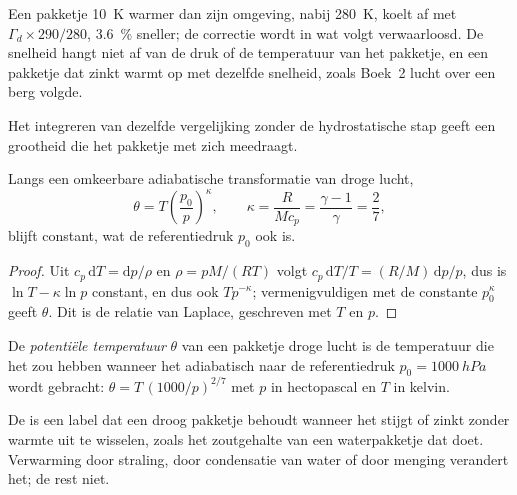 Een pakketje \qty{10}{K} warmer dan zijn omgeving, nabij \qty{280}{K}, koelt af met
$\Gamma_d \times 290/280$, \qty{3.6}{\percent} sneller; de correctie wordt
in wat volgt verwaarloosd. De snelheid hangt niet af van de druk of de temperatuur van
het pakketje, en een pakketje dat zinkt warmt op met dezelfde snelheid, zoals Boek~2
lucht over een berg volgde.

Het integreren van dezelfde vergelijking zonder de hydrostatische stap geeft een grootheid die het pakketje met zich meedraagt.

\begin{proposition}\label{prop:b1:fluid-envelopes-structure:theta}
Langs een omkeerbare adiabatische transformatie van droge lucht,
\[
  \theta = T\left(\frac{p_0}{p}\right)^{\kappa},\qquad \kappa = \frac{R}{Mc_p} =
  \frac{\gamma - 1}{\gamma} = \frac{2}{7},
\]
blijft constant, wat de referentiedruk $p_0$ ook is.
\end{proposition}

\begin{proof}
Uit $c_p\,\mathrm dT = \mathrm dp/\rho$ en $\rho = pM/(RT)$ volgt $c_p\,\mathrm dT/T
= (R/M)\,\mathrm dp/p$, dus is $\ln T - \kappa \ln p$ constant, en dus ook $T
p^{-\kappa}$; vermenigvuldigen met de constante $p_0^{\kappa}$ geeft $\theta$. Dit is
de relatie van Laplace, geschreven met $T$ en $p$.
\end{proof}

\begin{definition}\label{def:b1:fluid-envelopes-structure:potential-temperature}
De \emph{potentiële temperatuur} $\theta$ van een
pakketje droge lucht is de temperatuur die het zou hebben wanneer het adiabatisch naar
de referentiedruk $p_0 = \qty{1000}{hPa}$ wordt gebracht: $\theta = T\,(1000/p)^{2/7}$ met
$p$ in hectopascal en $T$ in kelvin.
\end{definition}

De  is een label dat een droog pakketje behoudt wanneer het stijgt of zinkt zonder warmte uit te wisselen, zoals het zoutgehalte van een waterpakketje dat doet. Verwarming door straling, door condensatie van water of door menging verandert het; de rest niet.

